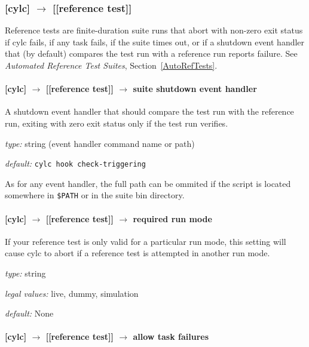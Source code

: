 \subsubsection[{[[}reference test{]]}]{[cylc] $\rightarrow$ [[reference test]] }
\label{ReferenceTestConfig}

Reference tests are finite-duration suite runs that abort with non-zero
exit status if cylc fails, if any task fails, if the suite times
out, or if a shutdown event handler that (by default) compares the test
run with a reference run reports failure. See {\em Automated Reference Test
Suites}, Section~\ref{AutoRefTests}.

\paragraph[suite shutdown event handler]{[cylc] $\rightarrow$ [[reference test]] $\rightarrow$ suite shutdown event handler}

A shutdown event handler that should compare the test run with the
reference run, exiting with zero exit status only if the test run
verifies.

\begin{myitemize}
    \item {\em type:} string (event handler command name or path)
    \item {\em default:} \lstinline=cylc hook check-triggering=
\end{myitemize}
As for any event handler, the full path can be ommited if the script is
located somewhere in \lstinline=$PATH= or in the suite bin directory.

\paragraph[required run mode]{[cylc] $\rightarrow$ [[reference test]] $\rightarrow$ required run mode}

If your reference test is only valid for a particular run mode, this
setting will cause cylc to abort if a reference test is attempted 
in another run mode.

\begin{myitemize}
    \item {\em type:} string
    \item {\em legal values:} live, dummy, simulation
    \item {\em default:} None
\end{myitemize}

\paragraph[allow task failures]{[cylc] $\rightarrow$ [[reference test]] $\rightarrow$ allow task failures}


